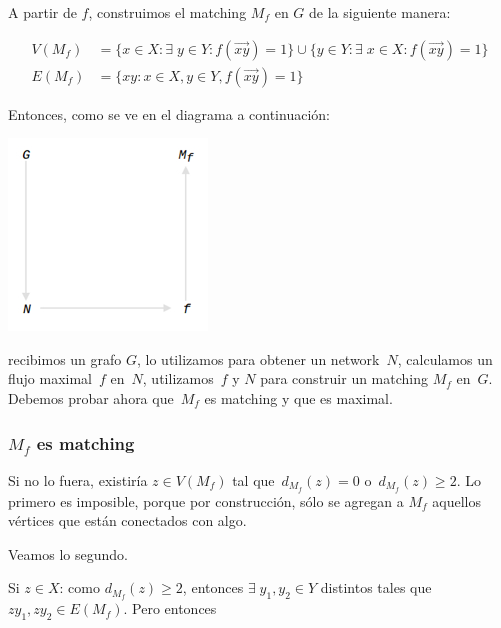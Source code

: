 \documentclass[10pt,a4paper]{article}
\begin{document}
A partir de $f$, construimos el matching $M_f$ en $G$ de la siguiente manera:

\begin{center}
\begin{align*} V(M_f) &= \{x\in X : \exists \;y \in Y : f(\overrightarrow{xy}) = 1\} \cup \{y \in Y : \exists \;x \in X : f(\overrightarrow{xy}) = 1\}\\ E(M_f) &= \{xy: x \in X, y \in Y, f(\overrightarrow{xy}) = 1\} \end{align*}
\end{center}

Entonces, como se ve en el diagrama a continuación:

\begin{center}

    \begin{adjustbox}{max size={\textwidth}{\textheight}}
        \includegraphics{definitions/matching_2.jpg}
        \end{adjustbox}
    
\end{center}

recibimos un grafo $G$, lo utilizamos para obtener un network $N$, calculamos un flujo maximal $f$ en $N$, utilizamos $f$ y $N$ para construir un matching $M_f$ en $G$. Debemos probar ahora que $M_f$ es matching y que es maximal.

\subsubsection*{$M_f$ es matching}

Si no lo fuera, existiría $z\in V(M_f)$ tal que $d_{M_f}(z) = 0$ o $d_{M_f}(z) \geq 2$. Lo primero es imposible, porque por construcción, sólo se agregan a $M_f$ aquellos vértices que están conectados con algo.

Veamos lo segundo.

Si $z \in X$: como $d_{M_f}(z) \geq 2$, entonces $\exists \;y_1, y_2 \in Y$ distintos tales que $zy_1, zy_2\in E(M_f)$. Pero entonces
\end{document}

